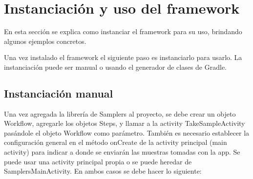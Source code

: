 \chapter{Instanciación  y uso del framework}
En esta sección se explica como instanciar el framework para su uso, brindando algunos ejemplos concretos.

Una vez instalado el framework el siguiente paso es instanciarlo para usarlo. La instanciación puede ser manual o usando el generador de clases de Gradle.


\section{Instanciación manual} \label{sec:instanciacion_manual}
Una vez agregada la librería de Samplers al proyecto, se debe crear un objeto Workflow, agregarle los objetos Steps, y llamar a la activity TakeSampleActivity pasándole el objeto Workflow como parámetro.
También es necesario establecer la configuración general en el método onCreate de la activity principal (main activity) para indicar a donde se enviarán las muestras tomadas con la app.
Se puede usar una activity principal propia o se puede heredar de SamplersMainActivity. En ambos casos se debe hacer lo siguiente:
